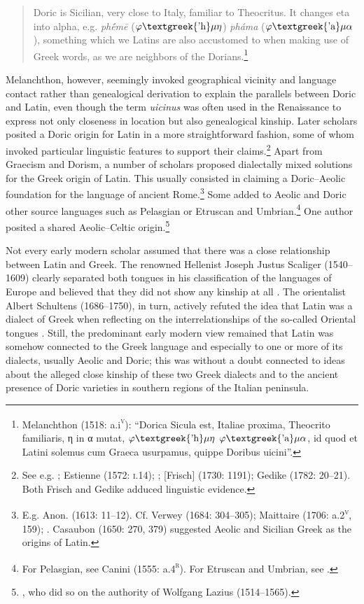 \begin{quote}
Doric is Sicilian, very close to Italy, familiar to Theocritus. It changes eta into alpha, e.g. \textit{phḗmē} ($\varphi \text{\textgreek{'h}}\mu \eta $) \textit{pháma} ($\varphi \text{\textgreek{'a}}\mu \alpha $), something which we Latins are also accustomed to when making use of Greek words, as we are neighbors of the Dorians.\footnote{Melanchthon (1518: a.i\textsc{\textsuperscript{v}}): “Dorica Sicula est, Italiae proxima, Theocrito familiaris, η in α mutat, $\varphi \text{\textgreek{'h}}\mu \eta $ $\varphi \text{\textgreek{'a}}\mu \alpha $, id quod et Latini solemus cum Graeca usurpamus, quippe Doribus uicini”.}
\end{quote}

Melanchthon, however, seemingly invoked geographical vicinity and language contact rather than genealogical derivation to explain the parallels between Doric and Latin, even though the term \textit{uicinus} was often used in the Renaissance to express not only closeness in location but also genealogical kinship. Later scholars posited a Doric origin for Latin in a more straightforward fashion, some of whom invoked particular linguistic features to support their claims.\footnote{See e.g. \citet[10]{Sylvius1531}; Estienne (1572: \textsc{i.}14); \citet[208]{Merula1605}; [Frisch] (1730: 1191); Gedike (1782: 20–21). Both Frisch and Gedike adduced linguistic evidence.} Apart from Graecism and Dorism, a number of scholars proposed dialectally mixed solutions for the Greek origin of Latin. This usually consisted in claiming a Doric–Aeolic foundation for the language of ancient Rome.\footnote{E.g. Anon. (1613: 11–12). Cf. Verwey (1684: 304–305); Maittaire (1706: a.2\textsc{\textsuperscript{v}}, 159); \citet[161]{Gesner1774}. Casaubon (1650: 270, 379) suggested Aeolic and Sicilian Greek as the origins of Latin.} Some added to Aeolic and Doric other source languages such as Pelasgian or Etruscan and Umbrian.\footnote{For Pelasgian, see Canini (1555: a.4\textsc{\textsuperscript{r}}). For Etruscan and Umbrian, see \citet[39]{Rüdiger1782}.} One author posited a shared Aeolic–Celtic origin.\footnote{\citet[13]{Nicolson1715}, who did so on the authority of Wolfgang Lazius (1514–1565).}

Not every early modern scholar assumed that there was a close relationship between Latin and Greek. The renowned Hellenist Joseph Justus Scaliger (1540–1609) clearly separated both tongues in his classification of the languages of Europe and believed that they did not show any kinship at all \citep{Scaliger1610}. The orientalist Albert Schultens (1686–1750), in turn, actively refuted the idea that Latin was a dialect of Greek when reflecting on the interrelationships of the so-called Oriental tongues \citep[109]{Schultens1738b}. Still, the predominant early modern view remained that Latin was somehow connected to the Greek language and especially to one or more of its dialects, usually Aeolic and Doric; this was without a doubt connected to ideas about the alleged close kinship of these two Greek dialects and to the ancient presence of Doric varieties in southern regions of the Italian peninsula.


